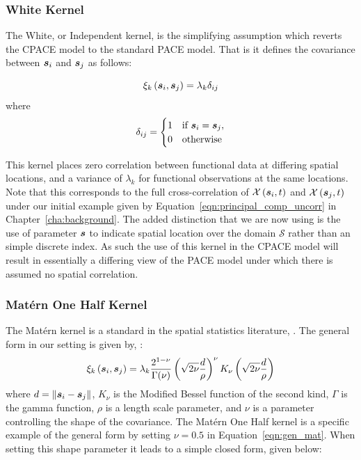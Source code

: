 \subsubsection{White Kernel \label{sssec:white_kern}}
The White, or Independent kernel, is the simplifying assumption which reverts the CPACE model to the standard PACE model. That is it defines the covariance between $\bm{{s}}_{i}$ and $\bm{{s}}_{j}$ as follows:

\begin{equation}
	\xi_k\left(\bm{{s}}_{i}, \bm{{s}}_{j}\right) = \lambda_k\delta_{ij}
\end{equation}
where 
\begin{equation*}
\delta_{ij} = \begin{cases}
	1 & \text{if } \bm{{s}}_{i} = \bm{{s}}_{j}, \\
	0 & \text{otherwise}
\end{cases} 
\end{equation*}

This kernel places zero correlation between functional data at differing spatial locations, and a variance of $\lambda_k$ for functional observations at the same locations.
Note that this corresponds to the full cross-correlation of $\mathcal{X}\left(\bm{{s}}_{i}, t \right)$ and  $\mathcal{X}\left(\bm{{s}}_{j}, t \right)$ under our initial example given by Equation~\ref{eqn:principal_comp_uncorr} in Chapter~\ref{cha:background}.
The added distinction that we are now using  is the use of parameter $\bm{{s}}$ to indicate spatial location over the domain $\mathcal{S}$ rather than an simple discrete index.
As such the use of this kernel in the CPACE model will result in essentially a differing view of the PACE model under which there is assumed no spatial correlation.

\subsubsection{Mat\'ern One Half Kernel \label{sssec:matern_one}}
The Mat\'ern kernel is a standard in the spatial statistics literature, \cite{cressie_statistics_2011}.
The general form in our setting is given by, \citep{cressie_statistics_2011}:
\begin{equation}
	\xi_k\left(\bm{{s}}_{i}, \bm{{s}}_{j}\right) = \lambda_k \frac{2^{1-\nu}}{\Gamma(\nu)}\left(\sqrt{2\nu} \frac{d}{\rho}\right)^\nu K_\nu \left(\sqrt{2\nu} \frac{d}{\rho}\right)
	\label{eqn:gen_mat}
\end{equation}
where $d = \lVert \bm{{s}}_{i} - \bm{{s}}_{j} \rVert$, $K_\nu$ is the Modified Bessel function of the second kind, $\Gamma$ is the gamma function, $\rho$ is a length scale parameter, and $\nu$ is a parameter controlling the shape of the covariance.
The Mat\'ern One Half kernel is a specific example of the general form by setting $\nu=0.5$ in Equation~\ref{eqn:gen_mat}. 
When setting this shape parameter it leads to a simple closed form, given below:

